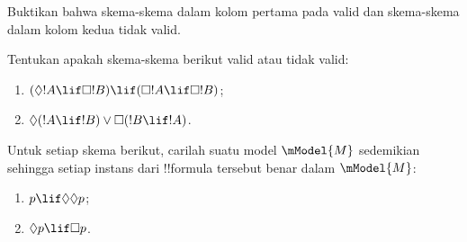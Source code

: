 \documentclass[../../../include/open-logic-section]{subfiles}
\begin{document}
\begin{prob}%
  Buktikan bahwa skema-skema dalam kolom pertama pada
   valid dan skema-skema
  dalam kolom kedua tidak valid.
\end{prob}

\begin{prob}
  Tentukan apakah skema-skema berikut valid atau tidak valid:
  \begin{enumerate}
  \item $(\Diamond !A \lif \Box !B) \lif (\Box !A \lif \Box
    !B)$;
  \item $\Diamond(!A \lif !B) \lor \Box(!B \lif !A)$.
  \end{enumerate}
\end{prob}

\begin{prob}
  Untuk setiap skema berikut, carilah suatu model $\mModel{M}$ sedemikian
  sehingga setiap instans dari !!{formula} tersebut benar dalam
  $\mModel{M}$:
  \begin{enumerate}
  \item $p \lif \Diamond\Diamond p$;
  \item $\Diamond p \lif \Box p$.
  \end{enumerate}
\end{prob}
\end{document}

